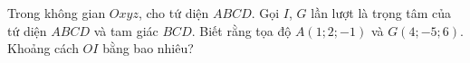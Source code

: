\begin{ex}
Trong không gian $Oxyz$, cho tứ diện $ABCD$. Gọi $I$, $G$ lần lượt là trọng tâm của tứ diện $ABCD$ và tam giác $BCD$. Biết rằng tọa độ $A(1;2;-1)$ và $G(4;-5;6)$. Khoảng cách $OI$ bằng bao nhiêu?
\end{ex}
